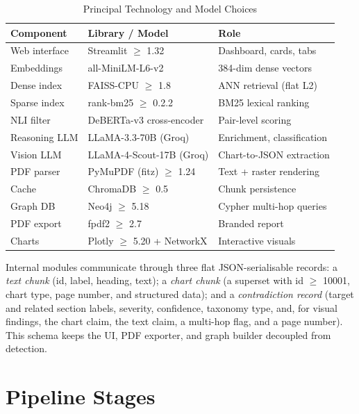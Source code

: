 \documentclass[conference]{IEEEtran}
\begin{document}
\begin{table}[htbp]
\caption{Principal Technology and Model Choices}
\label{tab:stack}
\begin{center}
\begin{tabular}{|l|l|l|}
\hline
\textbf{Component} & \textbf{Library / Model} & \textbf{Role} \\
\hline
Web interface & Streamlit $\geq$ 1.32 & Dashboard, cards, tabs \\
Embeddings & all-MiniLM-L6-v2 & 384-dim dense vectors \\
Dense index & FAISS-CPU $\geq$ 1.8 & ANN retrieval (flat L2) \\
Sparse index & rank-bm25 $\geq$ 0.2.2 & BM25 lexical ranking \\
NLI filter & DeBERTa-v3 cross-encoder & Pair-level scoring \\
Reasoning LLM & LLaMA-3.3-70B (Groq) & Enrichment, classification \\
Vision LLM & LLaMA-4-Scout-17B (Groq) & Chart-to-JSON extraction \\
PDF parser & PyMuPDF (fitz) $\geq$ 1.24 & Text + raster rendering \\
Cache & ChromaDB $\geq$ 0.5 & Chunk persistence \\
Graph DB & Neo4j $\geq$ 5.18 & Cypher multi-hop queries \\
PDF export & fpdf2 $\geq$ 2.7 & Branded report \\
Charts & Plotly $\geq$ 5.20 + NetworkX & Interactive visuals \\
\hline
\end{tabular}
\end{center}
\end{table}

Internal modules communicate through three flat JSON-serialisable records: a \emph{text chunk} (id, label, heading, text); a \emph{chart chunk} (a superset with id $\geq$ 10001, chart type, page number, and structured data); and a \emph{contradiction record} (target and related section labels, severity, confidence, taxonomy type, and, for visual findings, the chart claim, the text claim, a multi-hop flag, and a page number). This schema keeps the UI, PDF exporter, and graph builder decoupled from detection.

\section{Pipeline Stages}\label{sec:pipeline}
\end{document}
